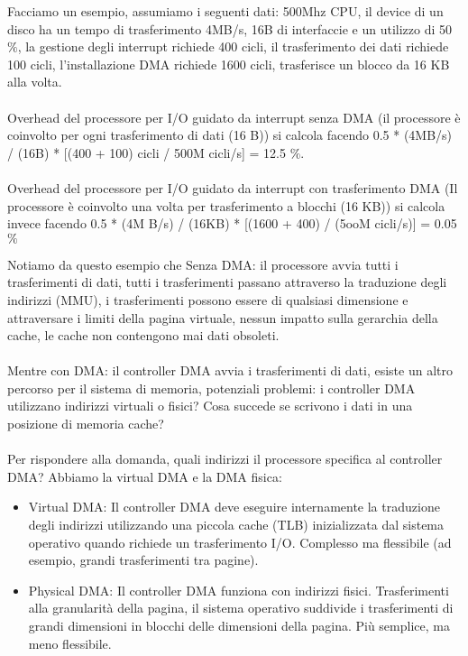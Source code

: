 \begin{example}
    Facciamo un esempio, assumiamo i seguenti dati: 500Mhz CPU, il device di un disco ha un tempo di trasferimento 4MB/s, 16B di interfaccie
    e un utilizzo di 50\(\%\), la gestione degli interrupt richiede 400 cicli, il trasferimento dei dati richiede 100 cicli, l'installazione DMA richiede 1600 cicli, trasferisce un blocco da 16 KB alla volta.\\\\
    Overhead del processore per I/O guidato da interrupt senza DMA (il processore è coinvolto per ogni trasferimento di dati (16 B)) si calcola facendo 0.5 * (4MB/s) / (16B) * [(400 + 100) cicli / 500M cicli/s] = 12.5 \(\%\).\\\\
    Overhead del processore per I/O guidato da interrupt con trasferimento DMA (Il processore è coinvolto una volta per trasferimento a blocchi (16 KB)) si calcola invece facendo 0.5 * (4M B/s) / (16KB) * [(1600 + 400) / (5ooM cicli/s)] = 0.05 \(\%\)
\end{example}

\hspace{-15pt}Notiamo da questo esempio che Senza DMA: il processore avvia tutti i trasferimenti di dati, tutti i trasferimenti passano attraverso la traduzione degli indirizzi (MMU), i trasferimenti possono essere di qualsiasi dimensione e attraversare i limiti della pagina virtuale, 
nessun impatto sulla gerarchia della cache, le cache non contengono mai dati obsoleti.\\\\
Mentre con DMA: il controller DMA avvia i trasferimenti di dati, esiste un altro percorso per il sistema di memoria, potenziali problemi: 
i controller DMA utilizzano indirizzi virtuali o fisici? Cosa succede se scrivono i dati in una posizione di memoria cache?\\\\
Per rispondere alla domanda, quali indirizzi il processore specifica al controller DMA? Abbiamo la virtual DMA e la 
DMA fisica:
\begin{itemize}
    \item Virtual DMA: Il controller DMA deve eseguire internamente la traduzione degli indirizzi utilizzando una piccola cache (TLB) inizializzata dal sistema operativo quando richiede un trasferimento I/O. Complesso ma flessibile (ad esempio, grandi trasferimenti tra pagine).
    \item Physical DMA: Il controller DMA funziona con indirizzi fisici. Trasferimenti alla granularità della pagina, il sistema operativo suddivide i trasferimenti di grandi dimensioni in blocchi delle dimensioni della pagina. Più semplice, ma meno flessibile.
\end{itemize}

